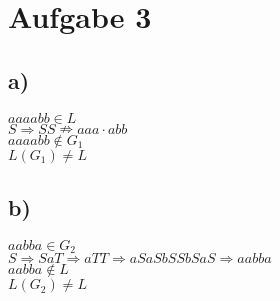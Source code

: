 \section*{Aufgabe 3}

\subsection*{a)}
$aaaabb\in L $ \\
$S \Rightarrow SS \nRightarrow aaa \cdot abb$\\
$aaaabb\notin G_1$ \\
$L(G_1)\neq L$
\subsection*{b)}
$aabba \in G_2$\\
$S \Rightarrow SaT \Rightarrow aTT \Rightarrow aSaSbSSbSaS \Rightarrow aabba $ \\
$aabba \notin L$\\
$L(G_2)\neq L$
